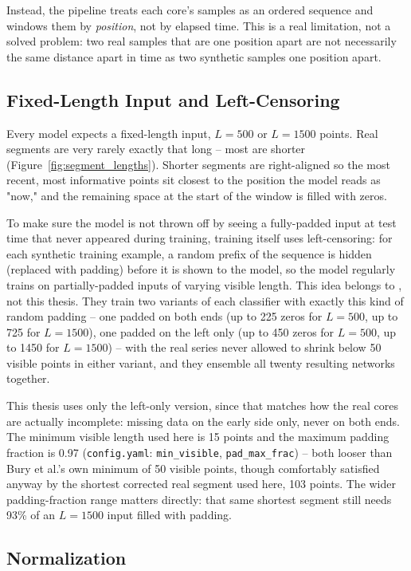 Instead, the pipeline treats each core's samples as an ordered sequence and windows them by \emph{position}, not by elapsed time. This is a real limitation, not a solved problem: two real samples that are one position apart are not necessarily the same distance apart in time as two synthetic samples one position apart.

\subsection{Fixed-Length Input and Left-Censoring}

Every model expects a fixed-length input, $L=500$ or $L=1500$ points. Real segments are very rarely exactly that long -- most are shorter (Figure~\ref{fig:segment_lengths}). Shorter segments are right-aligned so the most recent, most informative points sit closest to the position the model reads as "now," and the remaining space at the start of the window is filled with zeros.

To make sure the model is not thrown off by seeing a fully-padded input at test time that never appeared during training, training itself uses left-censoring: for each synthetic training example, a random prefix of the sequence is hidden (replaced with padding) before it is shown to the model, so the model regularly trains on partially-padded inputs of varying visible length. This idea belongs to \citet{bury2021}, not this thesis. They train two variants of each classifier with exactly this kind of random padding -- one padded on both ends (up to 225 zeros for $L=500$, up to 725 for $L=1500$), one padded on the left only (up to 450 zeros for $L=500$, up to 1450 for $L=1500$) -- with the real series never allowed to shrink below 50 visible points in either variant, and they ensemble all twenty resulting networks together.

This thesis uses only the left-only version, since that matches how the real cores are actually incomplete: missing data on the early side only, never on both ends. The minimum visible length used here is 15 points and the maximum padding fraction is 0.97 (\texttt{config.yaml}: \texttt{min\_visible}, \texttt{pad\_max\_frac}) -- both looser than Bury et al.'s own minimum of 50 visible points, though comfortably satisfied anyway by the shortest corrected real segment used here, 103 points. The wider padding-fraction range matters directly: that same shortest segment still needs 93\% of an $L=1500$ input filled with padding.

\subsection{Normalization}


